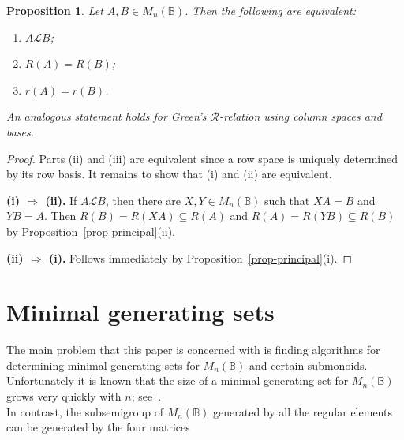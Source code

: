 \documentclass[11pt]{article}
\newtheorem{prop}[thm]{Proposition}
\numberwithin{equation}{section}
\newcommand{\B}{\mathbb{B}}
\newcommand{\Bn}{M_n(\B)}
\renewcommand{\L}{\mathscr{L}}
\newcommand{\R}{\mathscr{R}}
\begin{document}

\begin{prop} 
  Let $A, B \in \Bn$. Then the following are equivalent:
  \begin{enumerate}[label=\roman*]
    \item 
      $A \L B$;

    \item 
      $R(A) = R(B)$;

    \item 
      $r(A) = r(B)$.
  \end{enumerate}
  An analogous statement holds for Green's $\R$-relation using column spaces
  and bases. 
\end{prop}
\begin{proof}
  Parts (ii) and (iii) are equivalent since a row space is uniquely determined
  by its row basis. It remains to show that (i) and (ii) are
  equivalent.\bigskip

  \textbf{(i) $\Rightarrow$ (ii).} 
  If $A \L B$, then there are 
  $X, Y \in \Bn$ such that $XA = B$ and $YB = A$. Then $R(B) = R(XA) \subseteq
  R(A)$ and $R(A) = R(YB) \subseteq R(B)$ by
  Proposition~\ref{prop-principal}(ii).
  \bigskip

  \textbf{(ii) $\Rightarrow$ (i).} Follows immediately by
  Proposition~\ref{prop-principal}(i). 
\end{proof}


\section{Minimal generating sets}

The main problem that this paper is concerned with is finding algorithms for
determining minimal generating sets for $\Bn$ and certain submonoids.
Unfortunately it is known that the size of a minimal generating set for $\Bn$
grows very quickly with $n$; see~.\\

In contrast, the subsemigroup of $\Bn$ generated by all the regular elements can
be generated by the four matrices \cite{Roush1977aa}
\end{document}
